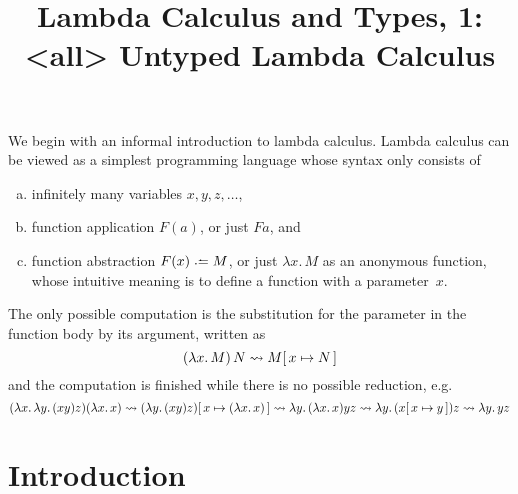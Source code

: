 \title{Lambda Calculus and Types, 1:\\<all>
  Untyped Lambda Calculus}

\begin{frame}
\maketitle
\end{frame}

We begin with an informal introduction to lambda calculus. Lambda calculus can
be viewed as a simplest programming language whose syntax only consists of
\begin{enumerate}[(a)]
  \item infinitely many variables $x, y, z, \ldots$, 
  \item function application $F(a)$, or just $F a$, and
  \item function abstraction $F(x) \defeq M$, or just $\lambda x.\, M$
    as an anonymous function, whose intuitive meaning is to define a function
    with a parameter~$x$.
\end{enumerate}
The only possible computation is the substitution for the parameter in the
function body by its argument, written as 
\[
  (\lambda x.\, M)\, N \leadsto M[\,x\mapsto N\,]
\]
and the computation is finished while there is no possible reduction, e.g.
\[
  (\lambda x.\, \lambda y.\, (x y) z) (\lambda x.\, x)
  \leadsto (\lambda y.\, (x y) z)[\,x\mapsto(\lambda x.\, x)\,]
  \leadsto \lambda y.\, (\lambda x.\, x) y z
  \leadsto \lambda y.\, (x[\,x\mapsto y\,]) z
  \leadsto \lambda y.\, y z
\]

\section{Introduction}

